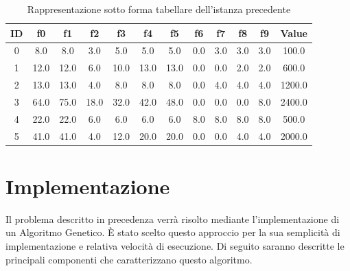 \begin{table}[H]
    \centering
    \begin{tabular}{||c||c||c||c||c||c||c||c||c||c||c||c||}
        \textbf{ID} & \textbf{f0} & \textbf{f1} & \textbf{f2} & \textbf{f3} & \textbf{f4} & \textbf{f5} & \textbf{f6} & \textbf{f7} & \textbf{f8} & \textbf{f9} & \textbf{Value} \\
        \hline
        0           & 8.0         & 8.0         & 3.0         & 5.0         & 5.0         & 5.0         & 0.0         & 3.0         & 3.0         & 3.0         & 100.0          \\
        1           & 12.0        & 12.0        & 6.0         & 10.0        & 13.0        & 13.0        & 0.0         & 0.0         & 2.0         & 2.0         & 600.0          \\
        2           & 13.0        & 13.0        & 4.0         & 8.0         & 8.0         & 8.0         & 0.0         & 4.0         & 4.0         & 4.0         & 1200.0         \\
        3           & 64.0        & 75.0        & 18.0        & 32.0        & 42.0        & 48.0        & 0.0         & 0.0         & 0.0         & 8.0         & 2400.0         \\
        4           & 22.0        & 22.0        & 6.0         & 6.0         & 6.0         & 6.0         & 8.0         & 8.0         & 8.0         & 8.0         & 500.0          \\
        5           & 41.0        & 41.0        & 4.0         & 12.0        & 20.0        & 20.0        & 0.0         & 0.0         & 4.0         & 4.0         & 2000.0         \\
    \end{tabular}
    \caption{Rappresentazione sotto forma tabellare dell'istanza precedente}
\end{table}

\section{Implementazione}

Il problema descritto in precedenza verrà risolto mediante l'implementazione
di un Algoritmo Genetico. È stato scelto questo approccio per la sua
semplicità di implementazione e relativa velocità di esecuzione. Di seguito
saranno descritte le principali componenti che caratterizzano questo algoritmo.

